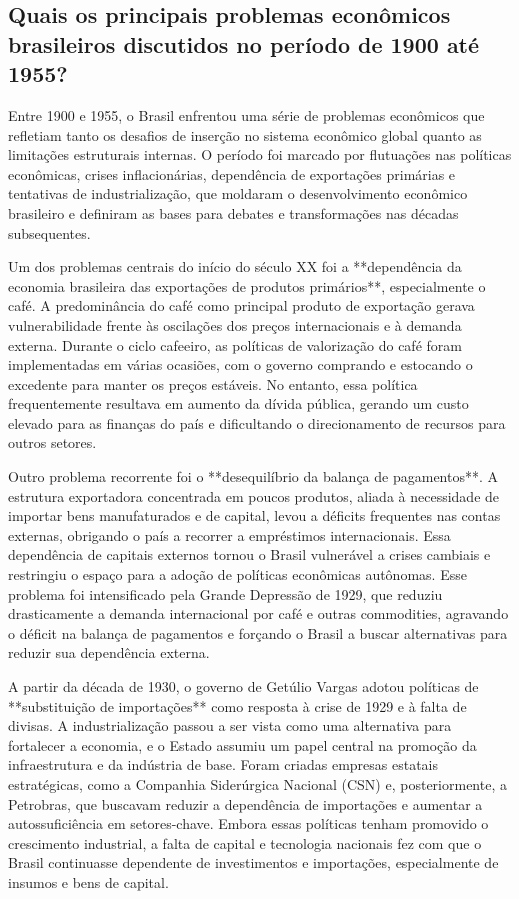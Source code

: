 \documentclass[a4paper,12pt]{article}[abntex2]
\begin{document}
\subsection{\textbf{Quais os principais problemas econômicos brasileiros discutidos no período de 1900 até 1955?}}

Entre 1900 e 1955, o Brasil enfrentou uma série de problemas econômicos que refletiam tanto os desafios de inserção no sistema econômico global quanto as limitações estruturais internas. O período foi marcado por flutuações nas políticas econômicas, crises inflacionárias, dependência de exportações primárias e tentativas de industrialização, que moldaram o desenvolvimento econômico brasileiro e definiram as bases para debates e transformações nas décadas subsequentes.

Um dos problemas centrais do início do século XX foi a **dependência da economia brasileira das exportações de produtos primários**, especialmente o café. A predominância do café como principal produto de exportação gerava vulnerabilidade frente às oscilações dos preços internacionais e à demanda externa. Durante o ciclo cafeeiro, as políticas de valorização do café foram implementadas em várias ocasiões, com o governo comprando e estocando o excedente para manter os preços estáveis. No entanto, essa política frequentemente resultava em aumento da dívida pública, gerando um custo elevado para as finanças do país e dificultando o direcionamento de recursos para outros setores.

Outro problema recorrente foi o **desequilíbrio da balança de pagamentos**. A estrutura exportadora concentrada em poucos produtos, aliada à necessidade de importar bens manufaturados e de capital, levou a déficits frequentes nas contas externas, obrigando o país a recorrer a empréstimos internacionais. Essa dependência de capitais externos tornou o Brasil vulnerável a crises cambiais e restringiu o espaço para a adoção de políticas econômicas autônomas. Esse problema foi intensificado pela Grande Depressão de 1929, que reduziu drasticamente a demanda internacional por café e outras commodities, agravando o déficit na balança de pagamentos e forçando o Brasil a buscar alternativas para reduzir sua dependência externa.

A partir da década de 1930, o governo de Getúlio Vargas adotou políticas de **substituição de importações** como resposta à crise de 1929 e à falta de divisas. A industrialização passou a ser vista como uma alternativa para fortalecer a economia, e o Estado assumiu um papel central na promoção da infraestrutura e da indústria de base. Foram criadas empresas estatais estratégicas, como a Companhia Siderúrgica Nacional (CSN) e, posteriormente, a Petrobras, que buscavam reduzir a dependência de importações e aumentar a autossuficiência em setores-chave. Embora essas políticas tenham promovido o crescimento industrial, a falta de capital e tecnologia nacionais fez com que o Brasil continuasse dependente de investimentos e importações, especialmente de insumos e bens de capital.
\end{document}
